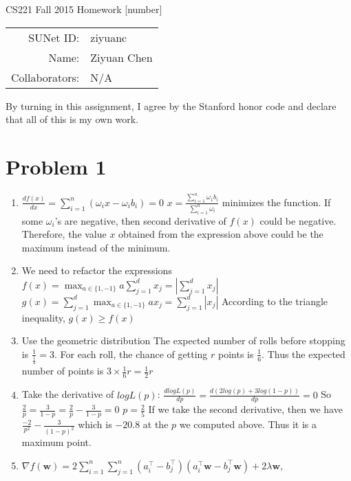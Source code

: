 \documentclass[12pt]{article}
\begin{document}
\begin{center}
{\Large CS221 Fall 2015 Homework [number]}

\begin{tabular}{rl}
SUNet ID: & ziyuanc \\
Name: & Ziyuan Chen \\
Collaborators: & N/A
\end{tabular}
\end{center}

By turning in this assignment, I agree by the Stanford honor code and declare
that all of this is my own work.

\section*{Problem 1}

\begin{enumerate}[label=(\alph*)]
  \item $\frac{df(x)}{dx}=\sum_{i=1}^{n} (\omega_ix-\omega_ib_i)=0$\newline
  $x=\frac{\sum_{i=1}^{n} \omega_1b_i}{\sum_{i=1}^{n} \omega_i}$ minimizes the function.\newline
  If some $\omega_i$'s are negative, then second derivative of $f(x)$ could be negative. Therefore, the value $x$ obtained from the expression above could be the maximum instead of the minimum.
  \item We need to refactor the expressions\newline
  $f(x) = \max_{a \in \{1,-1\}} a \sum_{j=1}^d x_j=|\sum_{j=1}^d x_j|$\newline
  $g(x) = \sum_{j=1}^d \max_{a \in \{1,-1\}} a x_j=\sum_{j=1}^d |x_j|$\newline
  According to the triangle inequality, $g(x)\geqslant f(x)$
  \item Use the geometric distribution\newline
  The expected number of rolls before stopping is $\frac{1}{\frac{1}{3}}=3$. For each roll, the chance of getting $r$ points is $\frac{1}{6}$. Thus the expected number of points is $3\times \frac{1}{6}r=\frac{1}{2}r$
  \item Take the derivative of $logL(p)$:\newline
  $\frac{dlogL(p)}{dp}=\frac{d(2log(p)+3log(1-p))}{dp}=0$\newline
  So $\frac{2}{p}=\frac{3}{1-p}=\frac{2}{p}-\frac{3}{1-p}=0$
  $p=\frac{2}{5}$\newline
  If we take the second derivative, then we have 
  $\frac{-2}{p^2}-\frac{3}{(1-p)^2}$ which is $-20.8$ at the $p$ we computed above. Thus it is a maximum point.
  \item $\nabla f(\mathbf w) = 2\sum_{i=1}^n \sum_{j=1}^n (a_i^\top - b_j^\top) (a_i^\top \mathbf w - b_j^\top \mathbf w) + 2\lambda \mathbf w,$
\end{enumerate}
\end{document}
